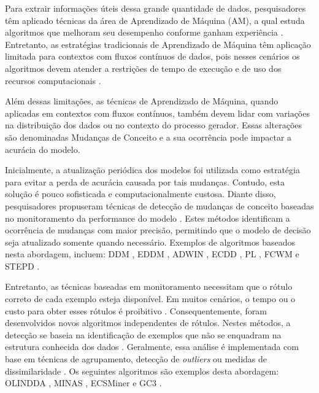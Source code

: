 \documentclass[msc, classic, a4paper]{ufbathesis}
\begin{document}
Para extrair informações úteis dessa grande quantidade de dados,
pesquisadores têm aplicado técnicas da área de Aprendizado de Máquina (AM),
a qual estuda algoritmos que melhoram seu desempenho conforme ganham experiência \cite{Mitchell:1997:ML:541177}.
%
Entretanto, as estratégias tradicionais de Aprendizado de Máquina têm aplicação limitada para contextos com fluxos contínuos de dados,
pois nesses cenários os algoritmos devem atender a restrições de tempo de execução e de uso dos recursos computacionais \cite{bifet2009data}.

Além dessas limitações,
as técnicas de Aprendizado de Máquina,
quando aplicadas em contextos com fluxos contínuos,
também devem lidar com variações na distribuição dos dados ou no contexto do processo gerador.
%
Essas alterações são denominadas Mudanças de Conceito \cite{Gama:2010:KDD:1855075} e
a sua ocorrência pode impactar a acurácia do modelo.

Inicialmente, a atualização periódica dos modelos foi utilizada como estratégia para evitar a perda de acurácia causada por tais mudanças.
%
Contudo, esta solução é pouco sofisticada e computacionalmente custosa.
%
Diante disso, pesquisadores propuseram técnicas de detecção de mudanças de conceito baseadas no monitoramento da performance do modelo \cite{Gama:2014:SCD:2597757.2523813}.
%
Estes métodos identificam a ocorrência de mudanças com maior precisão, permitindo que o modelo de decisão seja atualizado somente quando necessário.
%
Exemplos de algoritmos baseados nesta abordagem, incluem:
DDM \cite{GamaMCR04}, EDDM \cite{EDDM},
ADWIN \cite{BifetG07}, ECDD \cite{Ross:2012:EWM:2076039.2076307},
PL \cite{Bach:PL:2008}, FCWM \cite{FCWM} e STEPD \cite{STEPD}.

Entretanto, as técnicas baseadas em monitoramento necessitam que o rótulo correto de cada exemplo esteja disponível.
%
Em muitos cenários, o tempo ou o custo para obter esses rótulos é proibitivo \cite{Aggarwal:2006:DSM:1196418}.
%
Consequentemente, foram desenvolvidos novos algoritmos independentes de rótulos.
Nestes métodos, a detecção se baseia na identificação de exemplos que não se enquadram na estrutura conhecida dos dados \cite{Spinosa:2007:OCA:1244002.1244107}.
%
Geralmente, essa análise é implementada com base em técnicas de agrupamento, detecção de \textit{outliers} ou medidas de dissimilaridade \cite{Ryu:Kantardzic:2012}.
%
Os seguintes algoritmos são exemplos desta abordagem:
OLINDDA \cite{Spinosa:2007:OCA:1244002.1244107},
MINAS \cite{Faria:2013:NDA:2480362.2480515},
ECSMiner \cite{Masud:2011:CNC:1978259.1978529} e
GC3 \cite{Sethi2016b:GC3}.
\end{document}
